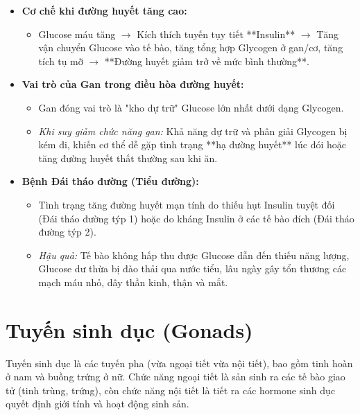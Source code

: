 \begin{itemize}
    \item \textbf{Cơ chế khi đường huyết tăng cao:}
    \begin{itemize}
        \item Glucose máu tăng $\rightarrow$ Kích thích tuyến tụy tiết **Insulin** $\rightarrow$ Tăng vận chuyển Glucose vào tế bào, tăng tổng hợp Glycogen ở gan/cơ, tăng tích tụ mỡ $\rightarrow$ **Đường huyết giảm trở về mức bình thường**.
    \end{itemize}

    \item \textbf{Vai trò của Gan trong điều hòa đường huyết:}
    \begin{itemize}
        \item Gan đóng vai trò là "kho dự trữ" Glucose lớn nhất dưới dạng Glycogen. 
        \item \textit{Khi suy giảm chức năng gan:} Khả năng dự trữ và phân giải Glycogen bị kém đi, khiến cơ thể dễ gặp tình trạng **hạ đường huyết** lúc đói hoặc tăng đường huyết thất thường sau khi ăn.
    \end{itemize}

    \item \textbf{Bệnh Đái tháo đường (Tiểu đường):}
    \begin{itemize}
        \item Tình trạng tăng đường huyết mạn tính do thiếu hụt Insulin tuyệt đối (Đái tháo đường týp 1) hoặc do kháng Insulin ở các tế bào đích (Đái tháo đường týp 2).
        \item \textit{Hậu quả:} Tế bào không hấp thu được Glucose dẫn đến thiếu năng lượng, Glucose dư thừa bị đào thải qua nước tiểu, lâu ngày gây tổn thương các mạch máu nhỏ, dây thần kinh, thận và mắt.
    \end{itemize}
\end{itemize}

\section{Tuyến sinh dục (Gonads)}

Tuyến sinh dục là các tuyến pha (vừa ngoại tiết vừa nội tiết), bao gồm tinh hoàn ở nam và buồng trứng ở nữ. Chức năng ngoại tiết là sản sinh ra các tế bào giao tử (tinh trùng, trứng), còn chức năng nội tiết là tiết ra các hormone sinh dục quyết định giới tính và hoạt động sinh sản.

